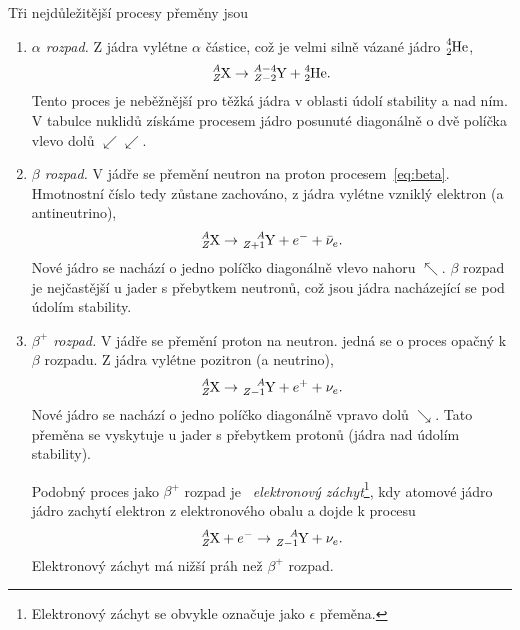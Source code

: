 \documentclass[a4paper,12pt,oneside]{article}
\theoremstyle{red}
\begin{document}
    Tři nejdůležitější procesy přeměny jsou
    \begin{enumerate}
        \item\emph{$\alpha$ rozpad.}
            Z jádra vylétne $\alpha$ částice, což je velmi silně vázané jádro $\ce{^{4}_{2}He}$,
            \begin{equation}
                \ce{^{\it A}_{\it Z}X}\rightarrow\ce{^{{\it A}-4}_{{\it Z}-2}Y}+\ce{^{4}_{2}He}.
            \end{equation}
            Tento proces je neběžnější pro těžká jádra v oblasti údolí stability a nad ním.
            V tabulce nuklidů získáme procesem jádro posunuté diagonálně o dvě políčka vlevo dolů $\swarrow\swarrow$.

        \item\emph{$\beta$ rozpad.}
            V jádře se přemění neutron na proton procesem~\eqref{eq:beta}.
            Hmotnostní číslo tedy zůstane zachováno, z jádra vylétne vzniklý elektron (a antineutrino),
            \begin{equation}
                \ce{^{\it A}_{\it Z}X}\rightarrow\ce{^{\it A}_{{\it Z}+1}Y}+e^{-}+\bar{\nu}_{e}.
            \end{equation}
            Nové jádro se nachází o jedno políčko diagonálně vlevo nahoru $\nwarrow$.
            $\beta$ rozpad je nejčastější u jader s přebytkem neutronů, což jsou jádra nacházející se pod údolím stability.
        
        \item\emph{$\beta^{+}$ rozpad.}
            V jádře se přemění proton na neutron.
            jedná se o proces opačný k $\beta$ rozpadu.
            Z jádra vylétne pozitron (a neutrino),
            \begin{equation}
                \ce{^{\it A}_{\it Z}X}\rightarrow\ce{^{\it A}_{{\it Z}-1}Y}+e^{+}+\nu_{e}.                    
            \end{equation}
            Nové jádro se nachází o jedno políčko diagonálně vpravo dolů $\searrow$.
            Tato přeměna se vyskytuje u jader s přebytkem protonů (jádra nad údolím stability).

            Podobný proces jako $\beta^{+}$ rozpad je ~\emph{elektronový záchyt}\footnote{Elektronový záchyt se obvykle označuje jako $\epsilon$ přeměna.}, kdy atomové jádro jádro zachytí elektron z elektronového obalu a dojde k procesu
            \begin{equation}
                \ce{^{\it A}_{\it Z}X}+e^{-}\rightarrow\ce{^{\it A}_{{\it Z}-1}Y}+\nu_{e}.                    
            \end{equation}
            Elektronový záchyt má nižší práh než $\beta^{+}$ rozpad.
    \end{enumerate}
\end{document}
